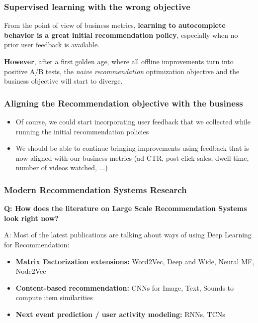  
  \begin{frame}
    \frametitle{Supervised learning with the wrong objective}
  
  From the point of view of business metrics, \textbf{learning to autocomplete behavior is a great initial recommendation policy}, especially when no prior user feedback is available. 
  
  \pause
  \textbf{However}, after a first golden age, where all offline improvements turn into positive A/B tests, the \emph{naive recommendation} optimization objective and the business objective will start to diverge.
  
  \end{frame}
  
  
  \begin{frame}
    \frametitle{Aligning the Recommendation objective with the business}
  
  \begin{itemize}
  \item Of course, we could start incorporating user feedback that we collected while running the initial recommendation policies  
  \item We should be able to continue bringing improvements using feedback that is now aligned with our business metrics (ad CTR, post click sales, dwell time, number of videos watched, ...)
  \end{itemize}
  
  \end{frame}
  
  




 
\begin{frame}
  \frametitle{Modern Recommendation Systems Research}
  
  \textbf{Q: How does the literature on Large Scale Recommendation Systems look right now?}
  
  A: Most of the latest publications are talking about ways of using Deep Learning for Recommendation:
  \begin{itemize}
  \item \textbf{Matrix Factorization extensions:} Word2Vec, Deep and Wide, Neural MF, Node2Vec 
  \item \textbf{Content-based recommendation:} CNNs for Image, Text, Sounds to compute item similarities
  \item \textbf{Next event prediction / user activity modeling:} RNNs, TCNs
  \end{itemize}
  
\end{frame}


